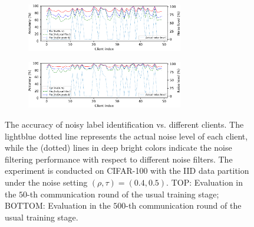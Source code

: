 \documentclass[letterpaper]{article} %
\begin{document}
\begin{figure}[t]
    \centering
    \begin{subfigure}{\textwidth}
        \centering
        \includegraphics[width=0.75\textwidth]{figures/identification_performance_50rnd.pdf}
    \end{subfigure}
    \begin{subfigure}{\textwidth}
        \centering
        \includegraphics[width=0.75\textwidth]{figures/identification_performance_500rnd.pdf}
    \end{subfigure}

    \caption{The accuracy of noisy label identification vs. different clients.
    The lightblue dotted line represents the actual noise level of each client, while the (dotted) lines in deep bright colors indicate the noise filtering performance with respect to different noise filters. The experiment is conducted on CIFAR-100 with the IID data partition under the noise setting $(\rho, \tau)=(0.4, 0.5)$. TOP: Evaluation in the $50$-th communication round of the usual training stage; BOTTOM: Evaluation in the $500$-th communication round of the usual training stage.}
    \label{Figure:Filtering-Accuracy}
\end{figure}
\end{document}
